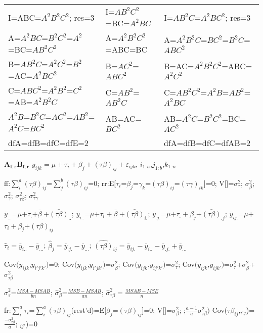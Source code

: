 \documentclass[
  10pt,
  twocolumn]{article}
\begin{document}
\begin{tabular}{ l|l|l }
I=ABC=$A^2B^2C^2$; res=3                 &I=$AB^2C^2$=BC=$A^2BC$&I=$AB^2C$=$A^2BC^2$; res=3\\
A=$A^2BC$=$B^2C^2$=$A^2$=BC=$AB^2C^2$    &A=$A^2B^2C^2$=ABC=BC  &A=$A^2B^2C$=$BC^2$=$B^2C$=$ABC^2$\\
B=$AB^2C$=$A^2C^2$=$B^2$=AC=$A^2BC^2$    &B=$AC^2$=$ABC^2$      &B=AC=$A^2B^2C^2$=ABC=$A^2C^2$ \\
C=$ABC^2$=$A^2B^2$=$C^2$=AB=$A^2B^2C$    &C=$AB^2$=$AB^2C$      &C=$AB^2C^2$=$A^2B$=$AB^2$=$A^2BC$ \\
$A^2B$=$B^2C$=$AC^2$=$AB^2$=$A^2C$=$BC^2$&AB=AC=$BC^2$          &AB=$A^2C$=$B^2C^2$=BC=$AC^2$\\
dfA=dfB=dfC=dfE=2& & dfA=dfB=dfC=dfAB=2
\end{tabular}

\hrulefill

\(\mathbf{A_{f,r}B_{f,r}}\)
\(y_{ijk}=\mu+\tau_i+\beta_j+(\tau\beta)_{ij}+\varepsilon_{ijk}\),
\(i_{1:a}\),\(j_{1:b}\),\(k_{1:n}\)

ff:\(\sum_i^a(\tau\beta)_{ij}\)=\(\sum_j^b(\tau\beta)_{ij}\)=0;
rr:E{[}\(\tau_{i}\)=\(\beta_{j}\)=\(\gamma_{k}\)=\((\tau\beta)_{ij}\)=\((\tau\gamma)_{ik}\){]}=0;
V{[}{]}=\(\sigma_\tau^2\); \(\sigma_\beta^2\); \(\sigma_\gamma^2\);
\(\sigma_{\tau\beta}^2\); \(\sigma_{\tau\gamma}^2\)

\(\bar y_{...}\)=\(\mu\)+\(\bar\tau_.\)+\(\bar\beta_.\)+\(\bar{(\tau\beta)}_{..}\);
\(\bar y_{i..}\)=\(\mu\)+\(\tau_i+\bar\beta_.\)+\(\bar{(\tau\beta)}_{i.}\);
\(\bar y_{.j.}\)=\(\mu\)+\(\bar\tau_.+\beta_j\)+\(\bar{(\tau\beta)}_{.j}\);
\(\bar y_{ij.}\)=\(\mu\)+\(\tau_i+\beta_j\)+\({(\tau\beta)}_{ij}\)

\(\hat\tau_i=\bar y_{i..}-\bar y_{...}\);
\(\hat\beta_j=\bar y_{.j.}-\bar y_{...}\);
\(\hat{(\tau\beta)}_{ij}=\bar y_{ij.}-\bar y_{i..}-\bar y_{.j.}+\bar y_{...}\)

Cov\((y_{ijk}\),\(y_{i'j'k'})\)=0;
Cov\((y_{ijk}\),\(y_{i'jk'})\)=\(\sigma^2_{\beta}\);
Cov\((y_{ijk}\),\(y_{ij'k'})\)=\(\sigma^2_{\tau}\);
Cov\((y_{ijk}\),\(y_{ijk'})\)=\(\sigma^2_{\tau}\)+\(\sigma^2_{\beta}\)+\(\sigma^2_{\tau\beta}\)

\(\hat\sigma_{\tau}^2\)=\(\frac{MSA-MSAB}{bn}\);
\(\hat\sigma_{\beta}^2\)=\(\frac{MSB-MSAB}{an}\);
\(\hat\sigma_{\tau\beta}^2=\frac{MSAB-MSE}{n}\)

\dotfill

fr:\(\sum_{i}^a\tau_{i}\)=\(\sum_{i}^a(\tau\beta)_{ij}\)(rest'd)=E{[}\(\beta_{j}\)=\((\tau\beta)_{ij}\){]}=0;
V{[}{]}=\(\sigma_\beta^2\); ;\(\frac{a-1}{a}\sigma^2_{\tau\beta})\)
Cov(\(\tau\beta_{ij}\),\(_{i'j}\))=\(\frac{-\sigma_{\tau\beta}^2}a\);
\(_{ij'}\))=0
\end{document}

